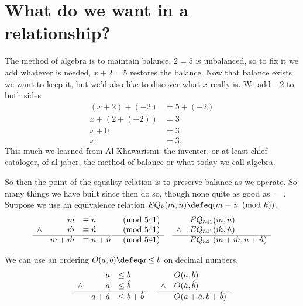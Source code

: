 \section{What do we want in a relationship?}

The method of algebra is to maintain balance.
$2=5$ is unbalanced, so to fix it we add whatever 
is needed, $x+2=5$ restores the balance.  Now 
that balance exists we want to keep it, but we'd 
also like to discover what $x$ really is.  
We add $-2$ to both sides
\begin{align*}
    (x+2)+(-2) & = 5+(-2)\\
    x+(2+(-2)) & = 3\\
    x+0 & = 3\\
    x & =3.
\end{align*}
This much we learned from Al Khawarismi, the inventer,
or at least chief cataloger, of al-jaber, the method of balance
or what today we call algebra.

So then the point of the equality relation is to preserve balance 
as we operate.  So many things we have built since then do so, 
though none quite as good as $=$.  Suppose we use an 
equivalence relation $EQ_k(m,n)\defeq (m\equiv n \pmod{k})$.
\begin{align*}
    \begin{array}{crlc}
        & m & \equiv  n & \pmod{541}\\
    \wedge    & \acute{m} & \equiv  \acute{n} & \pmod{541}\\
    \hline
    & m+\acute{m} & \equiv n+\acute{n} & \pmod{541} 
    \end{array}
    & & 
\begin{array}{cl}
        & EQ_{541}(m,n)\\
    \wedge & EQ_{541}(\acute{m},\acute{n})\\
    \hline 
        & EQ_{541}(m+\acute{m},n+\acute{n})
\end{array}
\end{align*}

We can use an ordering $O(a,b)\defeq a\leq b$ on 
decimal numbers.
\begin{align*}
    \begin{array}{crl}
        & a & \leq b\\
    \wedge    & \acute{a} & \leq \acute{b}\\
    \hline 
        & a+\acute{a} & \leq b+\acute{b}
    \end{array}    
    & & 
\begin{array}{cl}
        & O(a,b)\\
    \wedge & O(\acute{a},\acute{b})\\
    \hline 
        & O(a+\acute{a},b+\acute{b})
\end{array}
\end{align*}

